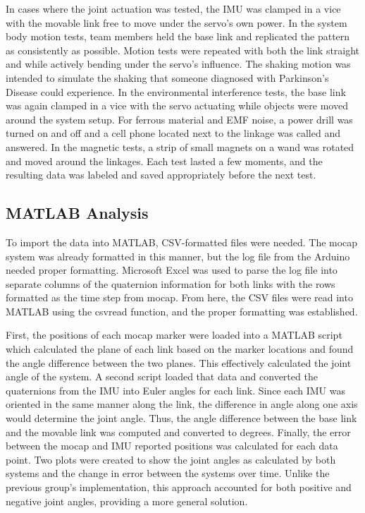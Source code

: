 \documentclass[letterpaper, 10 pt, conference]{ieeeconf}  %
\begin{document}
In cases where the joint actuation was tested, the IMU was clamped in a vice with the movable link free to move under the servo's own power. In the system body motion tests, team members held the base link and replicated the pattern as consistently as possible. Motion tests were repeated with both the link straight and while actively bending under the servo's influence. The shaking motion was intended to simulate the shaking that someone diagnosed with Parkinson's Disease could experience. In the environmental interference tests, the base link was again clamped in a vice with the servo actuating while objects were moved around the system setup. For ferrous material and EMF noise, a power drill was turned on and off and a cell phone located next to the linkage was called and answered. In the magnetic tests, a strip of small magnets on a wand was rotated and moved around the linkages. Each test lasted a few moments, and the resulting data was labeled and saved appropriately before the next test.

\subsection{MATLAB Analysis}
To import the data into MATLAB, CSV-formatted files were needed. The mocap system was already formatted in this manner, but the log file from the Arduino needed proper formatting. Microsoft Excel was used to parse the log file into separate columns of the quaternion information for both links with the rows formatted as the time step from mocap. From here, the CSV files were read into MATLAB using the csvread function, and the proper formatting was established. 

First, the positions of each mocap marker were loaded into a MATLAB script which calculated the plane of each link based on the marker locations and found the angle difference between the two planes. This effectively calculated the joint angle of the system. A second script loaded that data and converted the quaternions from the IMU into Euler angles for each link. Since each IMU was oriented in the same manner along the link, the difference in angle along one axis would determine the joint angle. Thus, the angle difference between the base link and the movable link was computed and converted to degrees. Finally, the error between the mocap and IMU reported positions was calculated for each data point. Two plots were created to show the joint angles as calculated by both systems and the change in error between the systems over time. Unlike the previous group's implementation, this approach accounted for both positive and negative joint angles, providing a more general solution.
\end{document}
